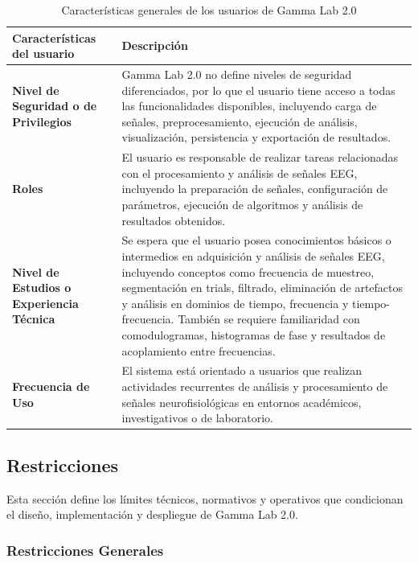 \documentclass[12pt, letterpaper]{article}
\begin{document}
\begin{table}[H]
\centering
\begin{tabular}{|p{5cm}|p{9cm}|}
\hline
\textbf{Características del usuario} & \textbf{Descripción} \\ \hline

\textbf{Nivel de Seguridad o de Privilegios} &
Gamma Lab 2.0 no define niveles de seguridad diferenciados, por lo que el
usuario tiene acceso a todas las funcionalidades disponibles, incluyendo
carga de señales, preprocesamiento, ejecución de análisis, visualización,
persistencia y exportación de resultados. \\ \hline

\textbf{Roles} &
El usuario es responsable de realizar tareas relacionadas con el
procesamiento y análisis de señales EEG, incluyendo la preparación de
señales, configuración de parámetros, ejecución de algoritmos y análisis de
resultados obtenidos. \\ \hline

\textbf{Nivel de Estudios o Experiencia Técnica} &
Se espera que el usuario posea conocimientos básicos o intermedios en
adquisición y análisis de señales EEG, incluyendo conceptos como frecuencia
de muestreo, segmentación en trials, filtrado, eliminación de artefactos y
análisis en dominios de tiempo, frecuencia y tiempo-frecuencia. También se
requiere familiaridad con comodulogramas, histogramas de fase y resultados
de acoplamiento entre frecuencias. \\ \hline

\textbf{Frecuencia de Uso} &
El sistema está orientado a usuarios que realizan actividades recurrentes
de análisis y procesamiento de señales neurofisiológicas en entornos
académicos, investigativos o de laboratorio. \\ \hline

\end{tabular}
\caption{Características generales de los usuarios de Gamma Lab 2.0}
\end{table}

\subsection{Restricciones}

Esta sección define los límites técnicos, normativos y operativos que
condicionan el diseño, implementación y despliegue de Gamma Lab 2.0.

\subsubsection{Restricciones Generales}
\end{document}
